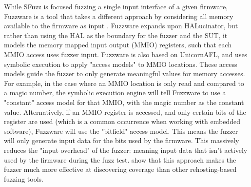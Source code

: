 \documentclass[../report.tex]{subfiles}
\begin{document}
While SFuzz is focused fuzzing a single input interface of a given firmware,
Fuzzware is a tool that takes a different approach by considering all memory
available to the firmware as input \citep{Fuzzware_2022}. Fuzzware expands upon
HALucinator, but rather than using the HAL as the boundary for the fuzzer and
the SUT, it models the memory mapped input output (MMIO) registers, such that
each MMIO access uses fuzzer input. Fuzzware is also based on UnicornAFL, and
uses symbolic execution to apply "access models" to MMIO locations. These
access models guide the fuzzer to only generate meaningful values for memory
accesses. For example, in the case where an MMIO location is only read and
compared to a magic number, the symbolic execution engine will tell Fuzzware to
use a "constant" access model for that MMIO, with the magic number as the
constant value. Alternatively, if an MMIO register is accessed, and only
certain bits of the register are used (which is a common occurrence when
working with embedded software), Fuzzware will use the "bitfield" access model.
This means the fuzzer will only generate input data for the bits used by the
firmware. This massively reduces the "input overhead" of the fuzzer: meaning
input data that isn't actively used by the firmware during the fuzz test.
\citet{Fuzzware_2022} show that this approach makes the fuzzer much more
effective at discovering coverage than other rehosting-based fuzzing tools.
\end{document}
